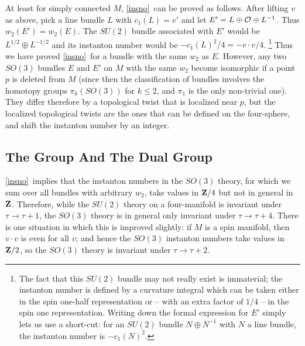 \documentclass[12pt]{article}
\numberwithin{equation}{section}
\begin{document}
At least for simply connected $M$, \eqref{insno}\ can be proved as follows.
After lifting $v$ as above, pick a line bundle $L$ with $c_1(L)=v'$
and let $E'=L\oplus {\cal O}\oplus L^{-1}$.  Thus $w_2(E')=w_2(E)$.
The $SU(2)$ bundle associated with $E'$ would be $L^{1/2}\oplus L^{-1/2}$
and its instanton number would be $-c_1(L)^2/4=-v\cdot v/4$.
\footnote{The fact that this $SU(2)$ bundle may not really exist is
  immaterial; the instanton number is defined by a curvature integral
  which can be taken either in the spin one-half representation or --
  with an extra factor of $1/4$ -- in the spin one representation.
  Writing down the formal expression for $E'$ simply lets us use a
  short-cut: for an $SU(2)$ bundle $N\oplus N^{-1}$ with $N$ a line
bundle, the instanton number is $-c_1(N)^2$.}
Thus we have proved \eqref{insno}\ for a bundle with the same $w_2$ as $E$.
However, any two $SO(3)$ bundles $E$ and $E'$
on $M$ with the same $w_2$ become isomorphic if a point $p$
is deleted from $M$ (since then the classification of bundles involves
  the homotopy groups $\pi_k(SO(3))$ for $k\leq 2$, and $\pi_1$ is the only
non-trivial one).  They differ therefore by a topological twist
that is localized near $p$, but the localized topological twists
are the ones that can be defined on the four-sphere, and shift the
instanton number by an integer.

\subsection{The Group And The Dual Group}

\eqref{insno}\ implies
that the instanton numbers in the $SO(3)$ theory,
for which we sum over all bundles with arbitrary $w_2$,
take values in ${\bf Z}/4 $ but not in general in ${\bf Z}$.
Therefore, while the $SU(2)$ theory on a four-manifold is
invariant under $\tau\to \tau+ 1$, the $SO(3)$ theory is in general only
invariant under $\tau\to\tau+4$.  There is one situation in which
this is improved slightly: if $M$ is a spin manifold, then $v\cdot v$
is even for all $v$; and hence
the $SO(3)$ instanton numbers take values
in ${\bf Z}/2$, so the $SO(3)$ theory is invariant under $\tau\to\tau+2$.
\end{document}

